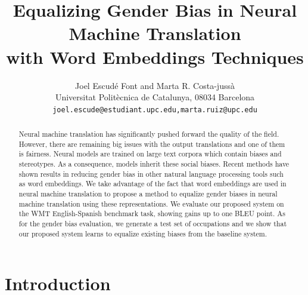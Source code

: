 \documentclass[11pt,a4paper]{article}
\title{Equalizing Gender Bias in Neural Machine Translation \\with Word Embeddings Techniques}
\author{Joel Escudé Font and Marta R. Costa-jussà\\
  Universitat Politècnica de Catalunya, 08034 Barcelona \\
  {\tt joel.escude@estudiant.upc.edu,marta.ruiz@upc.edu} \\}%
\date{}
\begin{document}
\maketitle
\begin{abstract}
Neural machine translation has significantly pushed forward the quality of the field. However, there are remaining big issues with the output translations and one of them is fairness. Neural models are trained on large text corpora which contain biases and stereotypes. As a consequence, models inherit these social biases. 
Recent methods have shown results in reducing gender bias in other natural language processing tools such as word embeddings.
We take advantage of the fact that word embeddings are used in neural machine translation to propose a method to equalize gender biases in neural machine translation using these representations.
We evaluate our proposed system on the WMT English-Spanish benchmark task, showing gains up to one BLEU point. As for the gender bias evaluation, we generate a test set of occupations and we show that our proposed system learns to equalize existing biases from the baseline system.
\end{abstract}

\section{Introduction}
\end{document}
